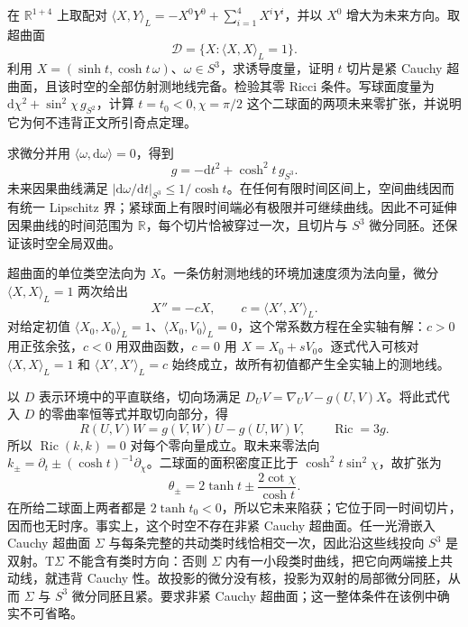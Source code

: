 \begin{exercise}\label{g3:ex:A-de-sitter-compact-cauchy}
	在 \(\mathbb R^{1+4}\) 上取配对 \(\langle X,Y\rangle_L=-X^0Y^0+\sum_{i=1}^4X^iY^i\)，并以 \(X^0\) 增大为未来方向。取超曲面
	\[
		\mathcal D=\{X:\langle X,X\rangle_L=1\}.
	\]
	利用 \(X=(\sinh t,\cosh t\,\omega)\)、\(\omega\in S^3\)，求诱导度量，证明 \(t\) 切片是紧 Cauchy 超曲面，且该时空的全部仿射测地线完备。检验其零 Ricci 条件。写球面度量为 \(\mathrm d\chi^2+\sin^2\chi\,g_{S^2}\)，计算 \(t=t_0<0,\chi=\pi/2\) 这个二球面的两项未来零扩张，并说明它为何不违背正文所引奇点定理。
\end{exercise}
\begin{solution}
	求微分并用 \(\langle\omega,\mathrm d\omega\rangle=0\)，得到
	\[
		g=-\mathrm dt^2+\cosh^2t\,g_{S^3}.
	\]
	未来因果曲线满足 \(|\mathrm d\omega/\mathrm dt|_{S^3}\le1/\cosh t\)。在任何有限时间区间上，空间曲线因而有统一 Lipschitz 界；紧球面上有限时间端必有极限并可继续曲线。因此不可延伸因果曲线的时间范围为 \(\mathbb R\)，每个切片恰被穿过一次，且切片与 \(S^3\) 微分同胚。还保证该时空全局双曲。

	超曲面的单位类空法向为 \(X\)。一条仿射测地线的环境加速度须为法向量，微分 \(\langle X,X\rangle_L=1\) 两次给出
	\[
		X''=-cX,\qquad c=\langle X',X'\rangle_L.
	\]
	对给定初值 \(\langle X_0,X_0\rangle_L=1\)、\(\langle X_0,V_0\rangle_L=0\)，这个常系数方程在全实轴有解：\(c>0\) 用正弦余弦，\(c<0\) 用双曲函数，\(c=0\) 用 \(X=X_0+sV_0\)。逐式代入可核对 \(\langle X,X\rangle_L=1\) 和 \(\langle X',X'\rangle_L=c\) 始终成立，故所有初值都产生全实轴上的测地线。

	以 \(D\) 表示环境中的平直联络，切向场满足 \(D_UV=\nabla_UV-g(U,V)X\)。将此式代入 \(D\) 的零曲率恒等式并取切向部分，得
	\[
		R(U,V)W=g(V,W)U-g(U,W)V,
		\qquad \operatorname{Ric}=3g.
	\]
	所以 \(\operatorname{Ric}(k,k)=0\) 对每个零向量成立。取未来零法向 \(k_\pm=\partial_t\pm(\cosh t)^{-1}\partial_\chi\)。二球面的面积密度正比于 \(\cosh^2t\sin^2\chi\)，故扩张为
	\[
		\theta_\pm=2\tanh t\pm\frac{2\cot\chi}{\cosh t}.
	\]
	在所给二球面上两者都是 \(2\tanh t_0<0\)，所以它未来陷获；它位于同一时间切片，因而也无时序。事实上，这个时空不存在非紧 Cauchy 超曲面。任一光滑嵌入 Cauchy 超曲面 \(\Sigma\) 与每条完整的共动类时线恰相交一次，因此沿这些线投向 \(S^3\) 是双射。\(\mathrm T\Sigma\) 不能含有类时方向：否则 \(\Sigma\) 内有一小段类时曲线，把它向两端接上共动线，就违背 Cauchy 性。故投影的微分没有核，投影为双射的局部微分同胚，从而 \(\Sigma\) 与 \(S^3\) 微分同胚且紧。要求非紧 Cauchy 超曲面；这一整体条件在该例中确实不可省略。
\end{solution}


